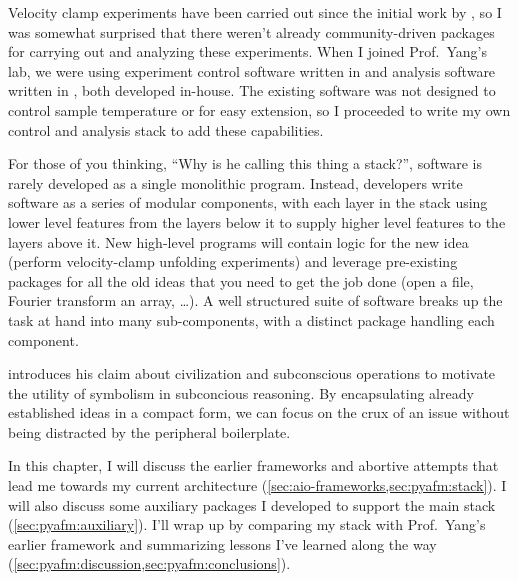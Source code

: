 Velocity clamp experiments have been carried out since the initial
work by \citet{rief97a}, so I was somewhat surprised that there
weren't already community-driven packages for carrying out and
analyzing these
experiments\citep{claerbout92,buckheit95,schwab00,vandewalle09}.  When
I joined Prof.~Yang's lab, we were using experiment control software
written in  and analysis software written in
, both developed in-house.  The existing
software was not designed to control sample temperature or for easy
extension, so I proceeded to write my own control and analysis stack
to add these capabilities.

For those of you thinking, ``Why is he calling this thing a stack?'',
software is rarely developed as a single monolithic program.  Instead,
developers write software as a series of modular components, with each
layer in the stack using lower level features from the layers below it
to supply higher level features to the layers above it.  New
high-level programs will contain logic for the new idea (perform
velocity-clamp unfolding experiments) and leverage pre-existing
packages for all the old ideas that you need to get the job done (open
a file, Fourier transform an array, \ldots).  A well structured suite
of software breaks up the task at hand into many sub-components, with
a distinct package handling each component.

\citet{whitehead11} introduces his claim about civilization and
subconscious operations to motivate the utility of symbolism in
subconcious reasoning.  By encapsulating already established ideas in
a compact form, we can focus on the crux of an issue without being
distracted by the peripheral boilerplate.

In this chapter, I will discuss the earlier frameworks and abortive
attempts that lead me towards my current architecture
(\cref{sec:aio-frameworks,sec:pyafm:stack}).  I will also discuss some
auxiliary packages I developed to support the main stack
(\cref{sec:pyafm:auxiliary}).  I'll wrap up by comparing my stack with
Prof.~Yang's earlier framework and summarizing lessons I've learned
along the way (\cref{sec:pyafm:discussion,sec:pyafm:conclusions}).
